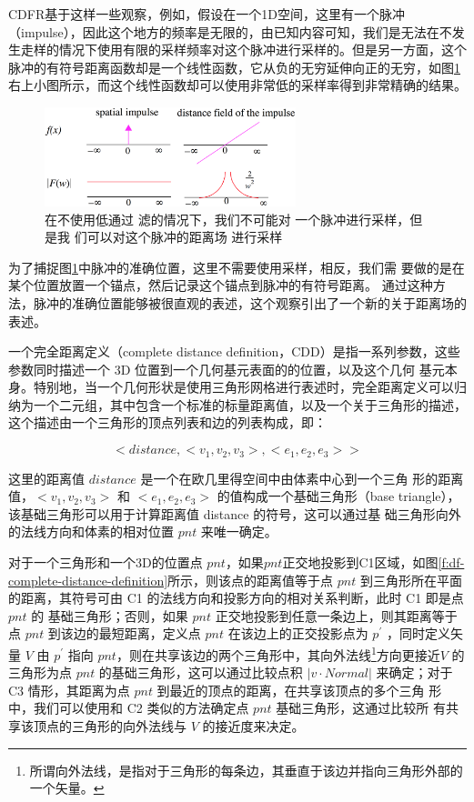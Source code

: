CDFR基于这样一些观察，例如，假设在一个1D空间，这里有一个脉冲（impulse），因此这个地方的频率是无限的，由已知内容可知，我们是无法在不发生走样的情况下使用有限的采样频率对这个脉冲进行采样的。但是另一方面，这个脉冲的有符号距离函数却是一个线性函数，它从负的无穷延伸向正的无穷，如图\ref{f:df-1-dimension-space}右上小图所示，而这个线性函数却可以使用非常低的采样率得到非常精确的结果。

\begin{figure}
	\sidecaption
	\includegraphics[width=0.65\textwidth]{figures/df/1-dimension-space}
	\caption{在不使用低通过 滤的情况下，我们不可能对 一个脉冲进行采样，但是我 们可以对这个脉冲的距离场 进行采样}
	\label{f:df-1-dimension-space}
\end{figure}

为了捕捉图\ref{f:df-1-dimension-space}中脉冲的准确位置，这里不需要使用采样，相反，我们需 要做的是在某个位置放置一个锚点，然后记录这个锚点到脉冲的有符号距离。 通过这种方法，脉冲的准确位置能够被很直观的表述，这个观察引出了一个新的关于距离场的表述。

一个完全距离定义（complete distance definition，CDD）是指一系列参数，这些参数同时描述一个 3D 位置到一个几何基元表面的的位置，以及这个几何 基元本身。特别地，当一个几何形状是使用三角形网格进行表述时，完全距离定义可以归纳为一个二元组，其中包含一个标准的标量距离值，以及一个关于三角形的描述，这个描述由一个三角形的顶点列表和边的列表构成，即：

\begin{equation}
	<distance,<v_1,v_2,v_3>,<e_1,e_2,e_3>>
\end{equation}

这里的距离值 $distance$ 是一个在欧几里得空间中由体素中心到一个三角 形的距离值，$< v_1,v_2,v_3 >$ 和 $< e_1,e_2,e_3 >$ 的值构成一个基础三角形（base triangle），该基础三角形可以用于计算距离值 distance 的符号，这可以通过基 础三角形向外的法线方向和体素的相对位置 $pnt$ 来唯一确定。

对于一个三角形和一个3D的位置点 $pnt$，如果$pnt$正交地投影到C1区域，如图\ref{f:df-complete-distance-definition}所示，则该点的距离值等于点 $pnt$ 到三角形所在平面的距离，其符号可由 C1 的法线方向和投影方向的相对关系判断，此时 C1 即是点 $pnt$ 的 基础三角形；否则，如果 $pnt$ 正交地投影到任意一条边上，则其距离等于点 $pnt$ 到该边的最短距离，定义点 $pnt$ 在该边上的正交投影点为 $p^{'}$ ，同时定义矢量 $V$ 由 $p^{'}$ 指向 $pnt$，则在共享该边的两个三角形中，其向外法线\footnote{所谓向外法线，是指对于三角形的每条边，其垂直于该边并指向三角形外部的一个矢量。}方向更接近$ V$ 的 三角形为点 $pnt$ 的基础三角形，这可以通过比较点积 $|v \cdot Normal|$ 来确定；对于C3 情形，其距离为点 $pnt$ 到最近的顶点的距离，在共享该顶点的多个三角 形中，我们可以使用和 C2 类似的方法确定点 $pnt$ 基础三角形，这通过比较所 有共享该顶点的三角形的向外法线与 $V$ 的接近度来决定。


